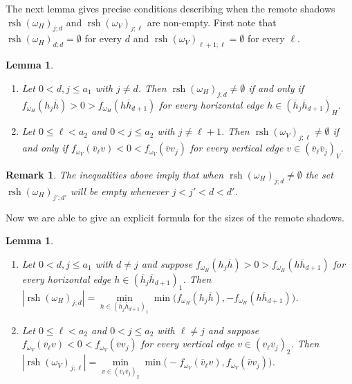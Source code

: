\documentclass{amsart}
\newtheorem{lemma}[theorem]{Lemma}
\newtheorem{remark}[theorem]{Remark}
\newcommand{\rsh}{\operatorname{rsh}}
\newenvironment{enumeratea}{\begin{enumerate}[\upshape (a)]}
                           {\end{enumerate}}
\begin{document}
 The next lemma gives precise conditions describing when the remote shadows $\rsh(\omega_H)_{j;d}$ and $\rsh(\omega_V)_{j;\ell}$ are non-empty.  First note that $\rsh(\omega_H)_{d;d}=\emptyset$ for every $d$ and $\rsh(\omega_V)_{\ell+1;\ell}=\emptyset$ for every $\ell$.
 \begin{lemma}\label{le:remote_shadow_conditions}\mbox{}
  \begin{enumeratea}
   \item Let $0<d,j\le a_1$ with $j\ne d$.  Then $\rsh(\omega_H)_{j;d}\ne\emptyset$ if and only if $f_{\omega_H}(h_j\overline{h})>0>f_{\omega_H}(h\overline{h}_{d+1})$ for every horizontal edge $h\in (\overline{h}_j\overline{h}_{d+1})_H$.
   \item Let $0\le\ell< a_2$ and $0<j\le a_2$ with $j\ne\ell+1$.  Then $\rsh(\omega_V)_{j;\ell}\ne\emptyset$ if and only if $f_{\omega_V}(\overline{v}_\ell v)<0<f_{\omega_V}(\overline{v}v_j)$ for every vertical edge $v\in (\overline{v}_\ell\overline{v}_j)_V$.
  \end{enumeratea}
 \end{lemma}
 \begin{remark}
  The inequalities above imply that when $\rsh(\omega_H)_{j;d}\ne\emptyset$ the set $\rsh(\omega_H)_{j';d'}$ will be empty whenever $j<j'<d<d'$.
 \end{remark}


 Now we are able to give an explicit formula for the sizes of the remote shadows.
 \begin{lemma}\label{le:remote_shadow_sizes}\mbox{}
  \begin{enumeratea}
   \item Let $0<d,j\le a_1$ with $d\ne j$ and suppose $f_{\omega_H}(h_j\overline{h})>0>f_{\omega_H}(h\overline{h}_{d+1})$ for every horizontal edge $h\in (\overline{h}_j\overline{h}_{d+1})_1$.  Then $|\rsh(\omega_H)_{j;d}|=\min\limits_{h\in (\overline{h}_j\overline{h}_{d+1})_1}\min\big(f_{\omega_H}(h_j\overline{h}),-f_{\omega_H}(h\overline{h}_{d+1})\big)$.
   \item Let $0\le\ell< a_2$ and $0<j\le a_2$ with $\ell\ne j$ and suppose $f_{\omega_V}(\overline{v}_\ell v)<0<f_{\omega_V}(\overline{v}v_j)$ for every vertical edge $v\in (\overline{v}_\ell\overline{v}_j)_2$.  Then $|\rsh(\omega_V)_{j;\ell}|=\min\limits_{v\in (\overline{v}_\ell\overline{v}_j)_2}\min\big(-f_{\omega_V}(\overline{v}_\ell v),f_{\omega_V}(\overline{v}v_j)\big)$.
  \end{enumeratea}
 \end{lemma}
\end{document}
